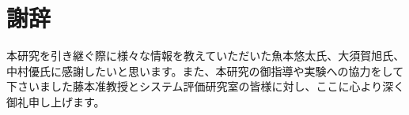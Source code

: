 \section*{謝辞}
本研究を引き継ぐ際に様々な情報を教えていただいた魚本悠太氏、大須賀旭氏、中村優氏に感謝したいと思います。また、本研究の御指導や実験への協力をして下さいました藤本准教授とシステム評価研究室の皆様に対し、ここに心より深く御礼申し上げます。
